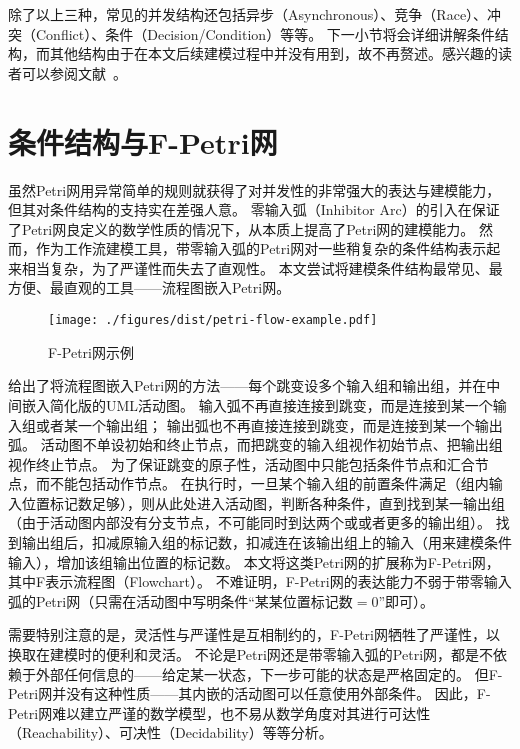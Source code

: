 \documentclass[index]{subfiles}
\begin{document}
除了以上三种，常见的并发结构还包括异步（Asynchronous）、竞争（Race）、冲突（Conflict）、条件（Decision/Condition）等等。
下一小节将会详细讲解条件结构，而其他结构由于在本文后续建模过程中并没有用到，故不再赘述。感兴趣的读者可以参阅文献~。

\section{条件结构与F-Petri网}
虽然Petri网用异常简单的规则就获得了对并发性的非常强大的表达与建模能力，但其对条件结构的支持实在差强人意\cite{peterson1981}。
零输入弧（Inhibitor Arc）的引入\cite{keller1972}在保证了Petri网良定义的数学性质的情况下，从本质上提高了Petri网的建模能力。
然而，作为工作流建模工具，带零输入弧的Petri网对一些稍复杂的条件结构表示起来相当复杂，为了严谨性而失去了直观性。
本文尝试将建模条件结构最常见、最方便、最直观的工具——流程图\cite{gilbreth1921}嵌入Petri网。

\begin{figure}[h]
  \centering
  \texttt{[image: ./figures/dist/petri-flow-example.pdf]}
  \caption{F-Petri网示例\label{fig:petri-flow}}
\end{figure}

给出了将流程图嵌入Petri网的方法——每个跳变设多个输入组和输出组，并在中间嵌入简化版的UML活动图。
输入弧不再直接连接到跳变，而是连接到某一个输入组或者某一个输出组；
输出弧也不再直接连接到跳变，而是连接到某一个输出弧。
活动图不单设初始和终止节点，而把跳变的输入组视作初始节点、把输出组视作终止节点。
为了保证跳变的原子性，活动图中只能包括条件节点和汇合节点，而不能包括动作节点。
在执行时，一旦某个输入组的前置条件满足（组内输入位置标记数足够），则从此处进入活动图，判断各种条件，直到找到某一输出组
（由于活动图内部没有分支节点，不可能同时到达两个或或者更多的输出组）。
找到输出组后，扣减原输入组的标记数，扣减连在该输出组上的输入（用来建模条件输入），增加该组输出位置的标记数。
本文将这类Petri网的扩展称为F-Petri网，其中F表示流程图（Flowchart）。
不难证明，F-Petri网的表达能力不弱于带零输入弧的Petri网（只需在活动图中写明条件“某某位置标记数$=0$”即可）。

需要特别注意的是，灵活性与严谨性是互相制约的，F-Petri网牺牲了严谨性，以换取在建模时的便利和灵活。
不论是Petri网还是带零输入弧的Petri网，都是不依赖于外部任何信息的——给定某一状态，下一步可能的状态是严格固定的。
但F-Petri网并没有这种性质——其内嵌的活动图可以任意使用外部条件。
因此，F-Petri网难以建立严谨的数学模型，也不易从数学角度对其进行可达性（Reachability）、可决性（Decidability）等等分析。
\end{document}
